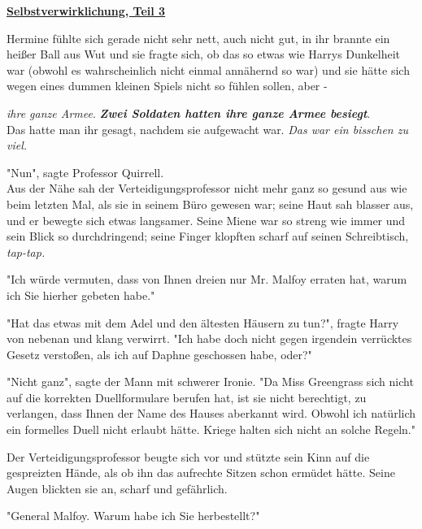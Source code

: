 

\hypertarget{selbstverwirklichung-teil-3}{%

\textbf{\uline{Selbstverwirklichung, Teil 3}}

Hermine fühlte sich gerade nicht sehr nett, auch nicht gut, in ihr brannte ein heißer Ball aus Wut und sie fragte sich, ob das so etwas wie Harrys Dunkelheit war (obwohl es wahrscheinlich nicht einmal annähernd so war) und sie hätte sich wegen eines dummen kleinen Spiels nicht so fühlen sollen, aber -

\emph{ihre ganze Armee}. \textbf{\emph{Zwei Soldaten hatten ihre ganze Armee besiegt}}.\\ Das hatte man ihr gesagt, nachdem sie aufgewacht war. \emph{Das war ein bisschen zu viel.}

"Nun", sagte Professor Quirrell.\\ Aus der Nähe sah der Verteidigungsprofessor nicht mehr ganz so gesund aus wie beim letzten Mal, als sie in seinem Büro gewesen war; seine Haut sah blasser aus, und er bewegte sich etwas langsamer. Seine Miene war so streng wie immer und sein Blick so durchdringend; seine Finger klopften scharf auf seinen Schreibtisch, \emph{tap-tap.}

"Ich würde vermuten, dass von Ihnen dreien nur Mr. Malfoy erraten hat, warum ich Sie hierher gebeten habe."

"Hat das etwas mit dem Adel und den ältesten Häusern zu tun?", fragte Harry von nebenan und klang verwirrt. "Ich habe doch nicht gegen irgendein verrücktes Gesetz verstoßen, als ich auf Daphne geschossen habe, oder?"

"Nicht ganz", sagte der Mann mit schwerer Ironie. "Da Miss Greengrass sich nicht auf die korrekten Duellformulare berufen hat, ist sie nicht berechtigt, zu verlangen, dass Ihnen der Name des Hauses aberkannt wird. Obwohl ich natürlich ein formelles Duell nicht erlaubt hätte. Kriege halten sich nicht an solche Regeln."

Der Verteidigungsprofessor beugte sich vor und stützte sein Kinn auf die gespreizten Hände, als ob ihn das aufrechte Sitzen schon ermüdet hätte. Seine Augen blickten sie an, scharf und gefährlich.

"General Malfoy. Warum habe ich Sie herbestellt?"

}
